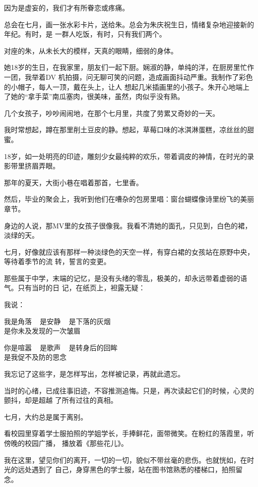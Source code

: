 		因为是虚妄的，我们才有所眷恋或疼痛。


		总会在七月，画一张水彩卡片，送给朱。总会为朱庆祝生日，情绪复杂地迎接新的年纪。有时，是
	一群人吃饭，有时，只有我们两个。

		对座的朱，从未长大的模样，天真的眼睛，细弱的身体。

		她18岁的生日，在我家里，朋友们一起下厨。娴淑的静，单纯的洋，在厨房里忙作一团，我举着DV
	机拍摄，问无聊可笑的问题，造成画面抖动严重。我制作了彩色的小帽子，每人一顶，戴在头上，让人
	想起几米插画里的小孩子。朱开心地端上了她的“拿手菜”南瓜塞肉，很美味，虽然，肉似乎没有熟。

		几个女孩子，吵吵闹闹地，在那个七月里，共度了劳累又奇妙的一天。

		我时常想起，蹲在那里削土豆皮的静。想起，草莓口味的冰淇淋蛋糕，凉丝丝的甜蜜。


		18岁，如一处明亮的印迹，雕刻少女最纯粹的欢乐，带着调皮的神情，在时光的录影带里挤眉弄眼。


		那年的夏天，大街小巷在唱着那首，七里香。

		然后，毕业的聚会上，我听到他们在嘈杂的包房里唱：窗台蝴蝶像诗里纷飞的美丽章节。


		身边的人说，那MV里的女孩子很像我。我看不清她的面孔，只见到，白色的裙，淡绿的天。


		七月，好像就应该有那样一种淡绿色的天空一样，有穿白裙的女孩站在原野中央，等待着季节的流
	转，誓言的变更。

		那些属于中学，末端的记忆，是没有头绪的零乱，极美的，却永远带着虚弱的语气。只有当时的日
	记，在纸页上，袒露无疑：


		我说：

		\longpoem{}{}{}
			我是角落 ~ 是安静 ~ 是下落的灰烟 \\
			是你未及发现的一次皱眉

			你是喧嚣 ~ 是歌声 ~ 是转身后的回眸 \\
			是我促不及防的思念
		\endlongpoem


		我忘记了这些字，是怎样写出，怎样被记录，再就此遗忘。

		当时的心绪，已成往事旧迹，不容推测追悔。只是，再次读起它们的时候，心灵的颤抖，却是超越
	了所有过往的真相。


		七月，大约总是属于离别。

		看校园里穿着学士服拍照的学姐学长，手捧鲜花，面带微笑。在粉红的落霞里，听傍晚的校园广播，
	播放着《那些花儿》。

		我在这里，望见你们的离开，一切的一切，貌似不带丝毫的悲伤。也就恍如，在时光的远处遇到了
	自己，身穿黑色的学士服，站在图书馆熟悉的楼梯口，拍照留念。

